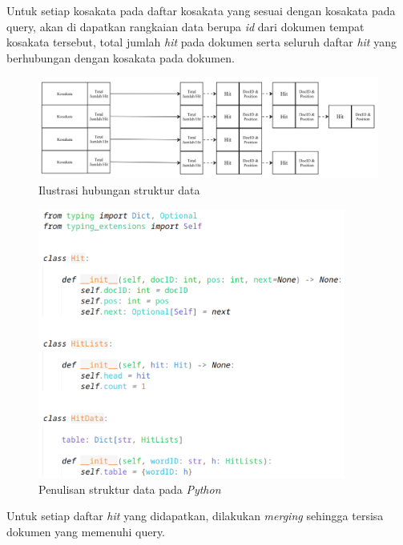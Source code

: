 Untuk setiap kosakata pada daftar kosakata yang sesuai dengan kosakata pada
query, akan di dapatkan rangkaian data berupa \textit{id} dari dokumen tempat
kosakata tersebut, total jumlah \textit{hit} pada dokumen serta seluruh daftar
\textit{hit} yang berhubungan dengan kosakata pada dokumen.

\begin{figure}[H]
  \centering{}
	\includegraphics[width=1\textwidth]{gambar/struktur_data_gambar}
  \caption{Ilustrasi hubungan struktur data}
\end{figure}

\begin{figure}[H]
  \centering{}
	\includegraphics[width=0.9\textwidth]{gambar/struktur_data_python}
  \caption{Penulisan struktur data pada \textit{Python}}
\end{figure}

Untuk setiap daftar \textit{hit} yang didapatkan, dilakukan \textit{merging}
sehingga tersisa dokumen yang memenuhi query.

